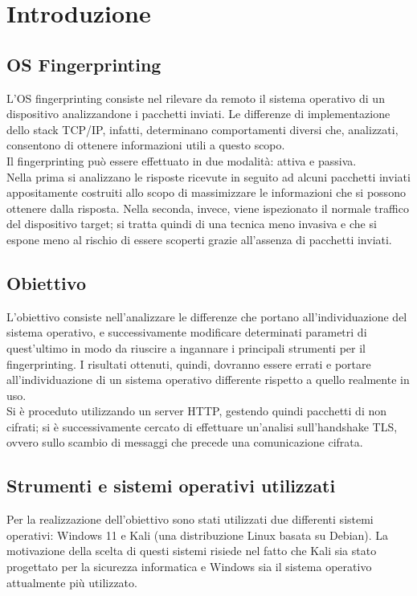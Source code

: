 

\chapter{Introduzione}
\label{introduzione}

\section{OS Fingerprinting}
\label{citazioni}

L'OS fingerprinting consiste nel rilevare da remoto il sistema operativo di un dispositivo analizzandone i pacchetti inviati. Le differenze di implementazione dello stack TCP/IP, infatti, determinano comportamenti diversi che, analizzati, consentono di ottenere informazioni utili a questo scopo. \\
Il fingerprinting può essere effettuato in due modalità: attiva e passiva. \\ 
Nella prima si analizzano le risposte ricevute in seguito ad alcuni pacchetti inviati appositamente costruiti allo scopo di massimizzare le informazioni che si possono ottenere dalla risposta.
Nella seconda, invece, viene ispezionato il normale traffico del dispositivo target; si tratta quindi di una tecnica meno invasiva e che si espone meno al rischio di essere scoperti grazie all'assenza di pacchetti inviati.

\section{Obiettivo}
L'obiettivo consiste nell'analizzare le differenze che portano all'individuazione del sistema operativo, e successivamente modificare determinati parametri di quest'ultimo in modo da riuscire a ingannare i principali strumenti per il fingerprinting.
I risultati ottenuti, quindi, dovranno essere errati e portare all'individuazione di un sistema operativo differente rispetto a quello realmente in uso.\\
Si è proceduto utilizzando un server HTTP, gestendo quindi pacchetti di non cifrati; si è successivamente cercato di effettuare un'analisi sull'handshake TLS, ovvero sullo scambio di messaggi che precede una comunicazione cifrata.

\section{Strumenti e sistemi operativi utilizzati}
Per la realizzazione dell'obiettivo sono stati utilizzati due differenti sistemi operativi: Windows 11 e Kali (una distribuzione Linux basata su Debian).
La motivazione della scelta di questi sistemi risiede nel fatto che Kali sia stato progettato per la sicurezza informatica e Windows sia il sistema operativo attualmente più utilizzato.

